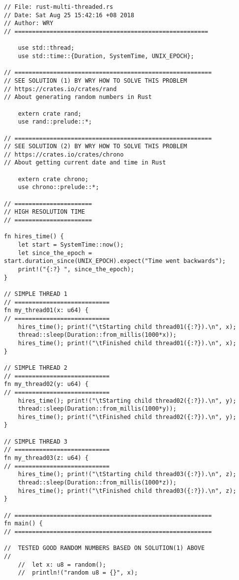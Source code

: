 \begin{lstlisting}[caption={App4-Rust Parallel Multithreading Codes}, label=App4-Rust Parallel Multithreading Codes]
// File: rust-multi-threaded.rs
// Date: Sat Aug 25 15:42:16 +08 2018
// Author: WRY
// =======================================================

	use std::thread;
	use std::time::{Duration, SystemTime, UNIX_EPOCH};

// ========================================================
// SEE SOLUTION (1) BY WRY HOW TO SOLVE THIS PROBLEM
// https://crates.io/crates/rand
// About generating random numbers in Rust

	extern crate rand;
	use rand::prelude::*;
	
// ========================================================
// SEE SOLUTION (2) BY WRY HOW TO SOLVE THIS PROBLEM
// https://crates.io/crates/chrono
// About getting current date and time in Rust

	extern crate chrono;
	use chrono::prelude::*;

// ======================
// HIGH RESOLUTION TIME
// ======================

fn hires_time() {
	let start = SystemTime::now();
	let since_the_epoch = start.duration_since(UNIX_EPOCH).expect("Time went backwards");
	print!("{:?} ", since_the_epoch);
}

// SIMPLE THREAD 1
// ===========================
fn my_thread01(x: u64) {
// ===========================
	hires_time(); print!("\tStarting child thread01({:?}).\n", x);
	thread::sleep(Duration::from_millis(1000*x)); 
	hires_time(); print!("\tFinished child thread01({:?}).\n", x);	
}

// SIMPLE THREAD 2
// ===========================
fn my_thread02(y: u64) {
// ===========================
	hires_time(); print!("\tStarting child thread02({:?}).\n", y);
	thread::sleep(Duration::from_millis(1000*y)); 
	hires_time(); print!("\tFinished child thread02({:?}).\n", y);	
}

// SIMPLE THREAD 3
// ===========================
fn my_thread03(z: u64) {
// ===========================
	hires_time(); print!("\tStarting child thread03({:?}).\n", z);
	thread::sleep(Duration::from_millis(1000*z)); 
	hires_time(); print!("\tFinished child thread03({:?}).\n", z);	
}

// ========================================================
fn main() {
// ========================================================

//  TESTED GOOD RANDOM NUMBERS BASED ON SOLUTION(1) ABOVE
// 
	//  let x: u8 = random();
	//  println!("random u8 = {}", x);
	

\end{lstlisting}
